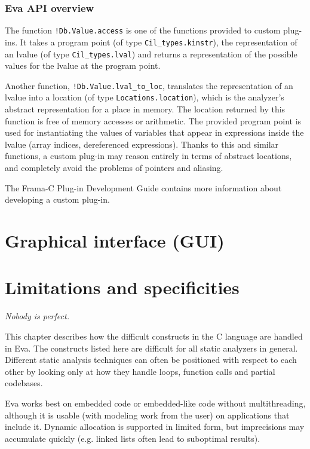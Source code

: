 \documentclass[web]{frama-c-book}
\newcommand{\Eva}{\textsf{Eva}}
\begin{document}
\subsection{\Eva{} API overview}

The function \lstinline|!Db.Value.access| is one of the
functions provided to custom plug-ins.
It takes a program point (of type \lstinline|Cil_types.kinstr|), 
the representation of
an lvalue (of type \lstinline|Cil_types.lval|) and returns a representation
of the possible values for the lvalue at the program point.

Another function, \lstinline|!Db.Value.lval_to_loc|, translates the
representation of an
lvalue into a location (of type \lstinline|Locations.location|), which
is the analyzer's abstract representation for a place in memory.
The location returned by this function is free of memory accesses
or arithmetic. The provided
program point is used for instantiating the values of variables
that appear in expressions
inside the lvalue (array indices, dereferenced expressions).
Thanks to this and similar functions, a custom plug-in may 
reason entirely in terms of abstract locations, and completely
avoid the problems of pointers and aliasing.

The Frama-C Plug-in Development Guide contains more information about
developing a custom plug-in.

\chapter{Graphical interface (GUI)}\label{gui}
\vspace{2cm}


\chapter{Limitations and specificities}\label{limitations_specificities}
\vspace{2cm}

{\em Nobody is perfect.}

\vspace{2cm}

This chapter describes how the difficult constructs in the C language
are handled in \Eva{}. The constructs listed
here are difficult for all static analyzers in general.
Different static analysis techniques can often be positioned
with respect to each other by looking only at how they handle loops,
function calls and partial codebases.

\Eva{} works best on embedded code
or embedded-like code without multithreading,
although it is usable (with modeling work from the user) on
applications that include it. Dynamic allocation is supported in
limited form, but imprecisions may accumulate quickly
(e.g. linked lists often lead to suboptimal results).
\end{document}
